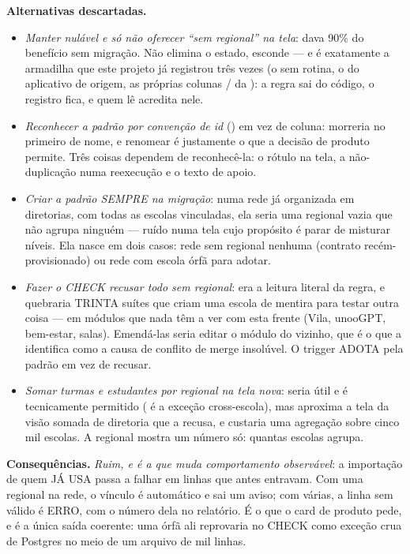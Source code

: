 \textbf{Alternativas descartadas.}
\begin{itemize}
  \item \emph{Manter  nulável e só não oferecer \enquote{sem
    regional} na tela}: dava 90\% do benefício sem migração. Não elimina o
    estado, esconde --- e é exatamente a armadilha que este projeto já registrou
    três vezes (o  sem rotina, o  do
    aplicativo de origem, as próprias colunas / da
    ): a regra sai do código, o registro fica, e quem lê acredita
    nele.
  \item \emph{Reconhecer a padrão por convenção de id} () em vez
    de coluna: morreria no primeiro  de nome, e renomear é justamente o
    que a decisão de produto permite. Três coisas dependem de reconhecê-la: o
    rótulo na tela, a não-duplicação numa reexecução e o texto de apoio.
  \item \emph{Criar a padrão SEMPRE na migração}: numa rede já organizada em
    diretorias, com todas as escolas vinculadas, ela seria uma regional vazia que
    não agrupa ninguém --- ruído numa tela cujo propósito é parar de misturar
    níveis. Ela nasce em dois casos: rede sem regional nenhuma (contrato
    recém-provisionado) ou rede com escola órfã para adotar.
  \item \emph{Fazer o CHECK recusar todo  sem regional}: era a leitura
    literal da regra, e quebraria TRINTA suítes que criam uma escola de mentira
    para testar outra coisa --- em módulos que nada têm a ver com esta frente
    (Vila, unooGPT, bem-estar, salas). Emendá-las seria editar o módulo do
    vizinho, que é o que a  identifica como a causa de conflito de
    merge insolúvel. O trigger ADOTA pela padrão em vez de recusar.
  \item \emph{Somar turmas e estudantes por regional na tela nova}: seria útil e é
    tecnicamente permitido ( é a exceção cross-escola), mas
    aproxima a tela da visão somada de diretoria que a  recusa, e
    custaria uma agregação sobre cinco mil escolas. A regional mostra um número
    só: quantas escolas agrupa.
\end{itemize}

\textbf{Consequências.} \emph{Ruim, e é a que muda comportamento observável}: a
importação  de quem JÁ USA passa a falhar em linhas que antes
entravam. Com uma regional na rede, o vínculo é automático e sai um aviso; com
várias, a linha sem  válido é ERRO, com o número dela no
relatório. É o que o card de produto pede, e é a única saída coerente: uma órfã
ali reprovaria no CHECK como exceção crua de Postgres no meio de um arquivo de
mil linhas.

